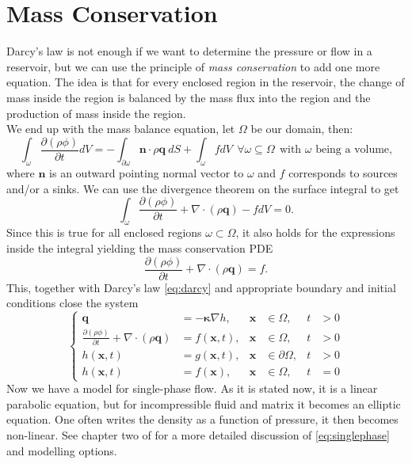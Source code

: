\documentclass[../Main/main.tex]{subfiles}
\begin{document}
\section{Mass Conservation}
Darcy's law is not enough if we want to determine the pressure or flow in a reservoir, but we can use the principle of \emph{mass conservation} to add one more equation. 
The idea is that for every enclosed region in the reservoir, the change of mass inside the region is balanced by the mass flux into the region and the production of mass inside the region.
\\
We end up with the mass balance equation, let $\Omega$ be our domain, then:
\begin{equation*}
\int_{\omega}\frac{\partial (\rho \phi) }{\partial t} dV= -\int_{\partial\omega}\bm{n}\cdot\rho\bm{q} \ dS+\int_{\omega} f dV \ \ \forall \omega \subseteq \Omega \ \ \text{with }\omega \text{ being a volume,}
\end{equation*}
where $\bm{n}$ is an outward pointing normal vector to $\omega$ and $f$ corresponds to sources and/or a sinks. We can use the divergence theorem on the surface integral to get
\begin{equation*}
\int_{\omega}\frac{\partial (\rho \phi) }{\partial t} + \nabla \cdot(\rho \bm{q}) -fdV= 0.
\end{equation*}
Since this is true for all enclosed regions $\omega\subset \Omega$, it also holds for the expressions inside the integral yielding the mass conservation PDE
\begin{equation*}
\frac{\partial (\rho \phi) }{\partial t} + \nabla \cdot (\rho \bm{q}) = f.
\end{equation*}
This, together with Darcy's law \eqref{eq:darcy} and appropriate boundary and initial conditions close the system
\begin{equation}\label{eq:singlephase}
\left \{ \begin{aligned}
	\bm{q} &=-\bm{\kappa} \nabla h, & \bm{x} &\in \Omega,  &t &>0 \\
	\frac{\partial (\rho \phi) }{\partial t} + \nabla \cdot(\rho \bm{q}) &=f(\bm{x},t), & \bm{x} &\in \Omega, & t &>0 \\
	h(\bm{x},t) &= g(\bm{x},t), &\bm{x} &\in \partial \Omega,&t &>0 \\
	h(\bm{x},t) &= f(\bm{x}), & 	\bm{x} &\in \Omega,  &	t &=0 
\end{aligned}\right. 
\end{equation}
Now we have a model for single-phase flow. As it is stated now, it is a linear parabolic equation, but for incompressible fluid and matrix it becomes an elliptic equation. One often writes the density as a function of pressure, it then becomes non-linear. See chapter two of \cite{Nordbotten} for a more detailed discussion of \eqref{eq:singlephase} and modelling options.
\end{document}
